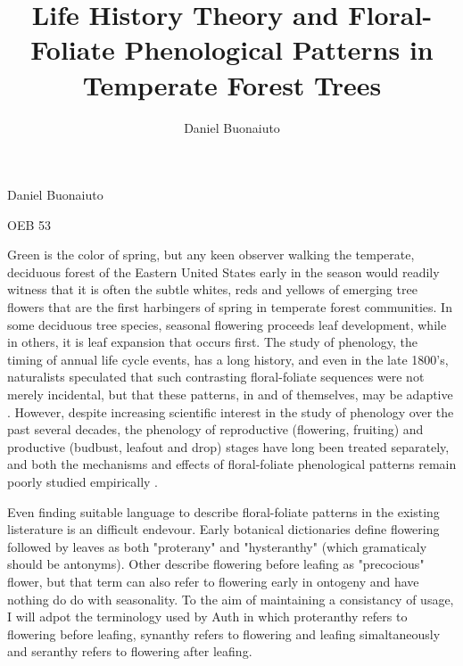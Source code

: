 \documentclass{article}\usepackage[]{graphicx}\usepackage[]{color}
\begin{document}
\title{Life History Theory and Floral-Foliate Phenological Patterns in Temperate Forest Trees}
\author{Daniel Buonaiuto}
Daniel Buonaiuto
\par OEB 53
\par\data{\today}

Green is the color of spring, but any keen observer walking the temperate, deciduous forest of the Eastern United States early in the season would readily witness that it is often the subtle whites, reds and yellows of emerging tree flowers that are the first harbingers of spring in temperate forest communities. In some deciduous tree species, seasonal flowering proceeds leaf development, while in others, it is leaf expansion that occurs first. The study of phenology, the timing of annual life cycle events, has a long history, and even in the late 1800's, naturalists speculated that such contrasting floral-foliate sequences were not merely incidental, but that these patterns, in and of themselves, may be adaptive \citep{}. However, despite increasing scientific interest in the study of phenology over the past several decades, the phenology of reproductive (flowering, fruiting) and productive (budbust, leafout and drop) stages have long been treated separately, and both the mechanisms and effects of floral-foliate phenological patterns remain poorly studied empirically \citep{Wolkovich2014}.
\par Even finding suitable language to describe floral-foliate patterns in the existing listerature is an difficult endevour. Early botanical dictionaries define flowering followed by leaves as both "proterany" and "hysteranthy" (which gramaticaly should be antonyms). Other describe flowering before leafing as "precocious" flower, but that term can also refer to flowering early in ontogeny and have nothing do do with seasonality. To the aim of maintaining a consistancy of usage, I will adpot the terminology used by Auth \citeyear{} in which proteranthy refers to flowering before leafing, synanthy refers to flowering and leafing simaltaneously and  seranthy refers to flowering after leafing.
\end{document}

